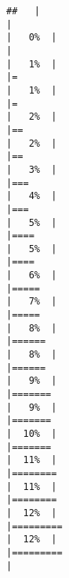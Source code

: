 \documentclass[
]{article}
\begin{document}
\begin{verbatim}
##   |                                                                              |                                                                      |   0%  |                                                                              |                                                                      |   1%  |                                                                              |=                                                                     |   1%  |                                                                              |=                                                                     |   2%  |                                                                              |==                                                                    |   2%  |                                                                              |==                                                                    |   3%  |                                                                              |===                                                                   |   4%  |                                                                              |===                                                                   |   5%  |                                                                              |====                                                                  |   5%  |                                                                              |====                                                                  |   6%  |                                                                              |=====                                                                 |   7%  |                                                                              |=====                                                                 |   8%  |                                                                              |======                                                                |   8%  |                                                                              |======                                                                |   9%  |                                                                              |=======                                                               |   9%  |                                                                              |=======                                                               |  10%  |                                                                              |=======                                                               |  11%  |                                                                              |========                                                              |  11%  |                                                                              |========                                                              |  12%  |                                                                              |=========                                                             |  12%  |                                                                              |=========                                                             |  
\end{verbatim}
\end{document}

